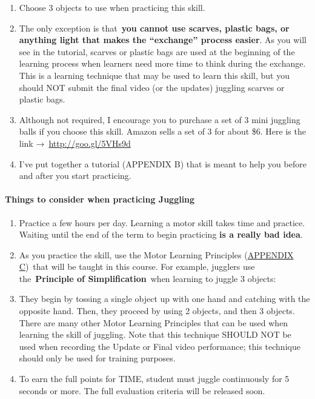 \documentclass[
  letterpaper,
  DIV=11,
  numbers=noendperiod]{scrartcl}
\let\oldparagraph\paragraph
\renewcommand{\paragraph}[1]{\oldparagraph{#1}\mbox{}}
\providecommand{\tightlist}{%
  \setlength{\itemsep}{0pt}\setlength{\parskip}{0pt}}\usepackage{longtable,booktabs,array}
\begin{document}
\begin{enumerate}
\def\labelenumi{\arabic{enumi}.}
\item
  Choose 3 objects to use when practicing this skill.
\item
  The only exception is that~\textbf{you cannot use scarves, plastic
  bags, or anything light that makes the ``exchange'' process easier}.
  As you will see in the tutorial, scarves or plastic bags are used at
  the beginning of the learning process when learners need more time to
  think during the exchange. This is a learning technique that may be
  used to learn this skill, but you should NOT submit the final video
  (or the updates) juggling scarves or plastic bags.~~
\item
  Although not required, I encourage you to purchase a set of 3 mini
  juggling balls if you choose this skill. Amazon sells a set of 3 for
  about \$6. Here is the link →~\url{http://goo.gl/5VHs9d}
\item
  I've put together a tutorial (APPENDIX B) that is meant to help you
  before and after you start practicing.
\end{enumerate}

\hypertarget{things-to-consider-when-practicing-juggling}{%
\paragraph{\texorpdfstring{Things to consider when practicing
\textbf{Juggling}}{Things to consider when practicing Juggling}}\label{things-to-consider-when-practicing-juggling}}

\begin{enumerate}
\def\labelenumi{\arabic{enumi}.}
\tightlist
\item
  Practice a few hours per day. Learning a motor skill takes time and
  practice. Waiting until the end of the term to begin practicing
  \textbf{is a really bad idea}.
\item
  As you practice the skill, use the Motor Learning Principles
  (\protect\hyperlink{sec-appendix-c}{APPENDIX C})~that will be taught
  in this course. For example, jugglers use the~\textbf{Principle of
  Simplification}~when learning to juggle 3 objects:
\item
  They begin by tossing a single object up with one hand and catching
  with the opposite hand. Then, they proceed by using 2 objects, and
  then 3 objects. There are many other Motor Learning Principles that
  can be used when learning the skill of juggling. Note that this
  technique SHOULD NOT be used when recording the Update or Final video
  performance; this technique should only be used for training
  purposes.~
\item
  To earn the full points for TIME, student must juggle continuously for
  5 seconds or more. The full evaluation criteria will be released soon.
\end{enumerate}
\end{document}
